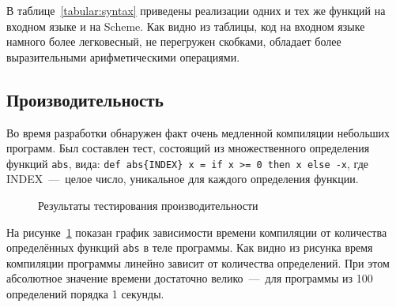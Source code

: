 \documentclass[12pt,a4paper,oneside]{extarticle}
\begin{document}
        В таблице~\ref{tabular:syntax} приведены реализации одних и тех же функций на входном языке и на Scheme.
        Как видно из таблицы, код на входном языке намного более легковесный, не перегружен скобками, обладает более выразительными арифметическими операциями.

    \clearpage

    \subsection{Производительность}
        \label{subsubsec:perfomance}
        Во время разработки обнаружен факт очень медленной компиляции небольших программ.
        Был составлен тест, состоящий из множественного определения функций \lstinline$abs$, вида: \lstinline$def abs{INDEX} x = if x >= 0 then x else -x$, где {INDEX}~---~целое число, уникальное для каждого определения функции.        
        \begin{figure}[h!]        
        \centering
        \caption{Результаты тестирования производительности}
        \label{pic:test}
        \end{figure}
        На рисунке~\ref{pic:test} показан график зависимости времени компиляции от количества определённых функций \lstinline$abs$ в теле программы. Как видно из рисунка время компиляции программы линейно зависит от количества определений. При этом абсолютное значение времени достаточно велико~---~для программы из 100 определений порядка 1 секунды.
\end{document}

